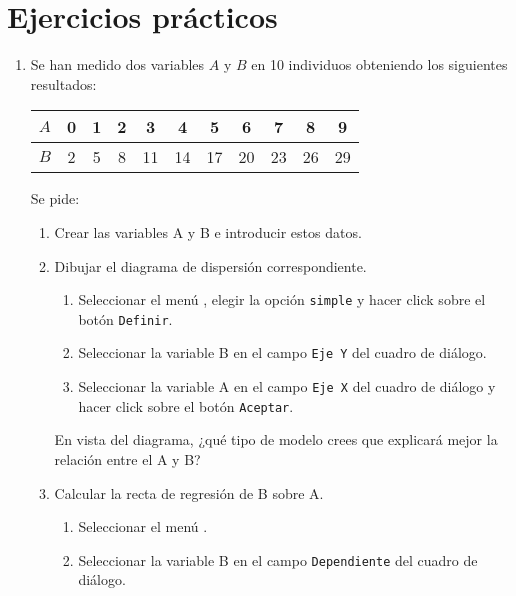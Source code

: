 \section{Ejercicios prácticos}
\begin{enumerate}[leftmargin=*]
\item Se han medido dos variables $A$ y $B$ en 10 individuos
obteniendo los siguientes resultados:
\begin{center}
\begin{tabular}{c|cccccccccc}
$A$& 0 & 1 & 2 & 3 & 4 & 5 & 6 & 7 & 8 & 9 \\
\hline $B$& 2 & 5 & 8 & 11 & 14 & 17 & 20 & 23 & 26 & 29
\end{tabular}
\end{center}

Se pide:

\begin{enumerate}
\item  Crear las variables \textsf{A} y \textsf{B} e introducir estos datos.


\item  Dibujar el diagrama de dispersión correspondiente.

\begin{indicacion}{
\begin{enumerate}
\item Seleccionar el menú , elegir
la opción \texttt{simple} y  hacer click sobre el botón
\texttt{Definir}. \item Seleccionar la variable \textsf{B} en el
campo \texttt{Eje Y} del cuadro de diálogo. \item Seleccionar la
variable \textsf{A} en el campo \texttt{Eje X} del cuadro de
diálogo y hacer click sobre el botón \texttt{Aceptar}.
\end{enumerate}}
\end{indicacion}


En vista del diagrama, ¿qué tipo de modelo crees que explicará
mejor la relación entre el A y B?

\item Calcular la recta de regresión de \textsf{B} sobre
\textsf{A}.

\begin{indicacion}{
\begin{enumerate}
\item Seleccionar el menú .

\item Seleccionar la variable \textsf{B} en el campo
\texttt{Dependiente} del cuadro de diálogo.


\end{enumerate}}
\end{indicacion}
\end{enumerate}
\end{enumerate}
